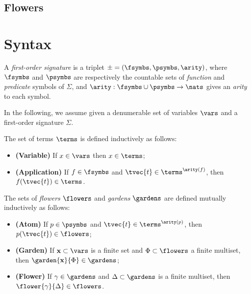 \subsection{Flowers}


\section*{Syntax}


\begin{definition}
  A \emph{first-order signature} is a triplet $\mathcal{\Sigma} = (
  \fsymbs, \psymbs, \arity )$, where $\fsymbs$ and $\psymbs$ are
  respectively the countable sets of \emph{function} and \emph{predicate}
  symbols of $\Sigma$, and $\arity : \fsymbs \cup \psymbs \to \nats$ gives an
  \emph{arity} to each symbol.
\end{definition}

In the following, we assume given a denumerable set of variables $\vars$
and a first-order signature $\Sigma$.

\begin{definition}[Terms]
  The set of terms $\terms$ is defined inductively as follows:
  \begin{itemize}
    \item{\textbf{(Variable)}} If $x \in \vars$ then $x \in \terms$;
    \item{\textbf{(Application)}} If $f \in \fsymbs$ and $\tvec{t}
    \in \terms^{\arity(f)}$, then $f(\tvec{t}) \in \terms$.
  \end{itemize}
\end{definition}

\begin{definition}[Flowers]
  The sets of \emph{flowers} $\flowers$ and \emph{gardens} $\gardens$ are
  defined mutually inductively as follows:
  \begin{itemize}
    \item{\textbf{(Atom)}} If $p \in \psymbs$ and $\tvec{t} \in
    \terms^{\arity(p)}$, then $p(\tvec{t}) \in \flowers$;
    \item{\textbf{(Garden)}} If $\mathbf{x} \subset \vars$ is a finite set and $\Phi
    \subset \flowers$ a finite multiset, then $\garden{\mathbf{x}}{\Phi} \in
    \gardens$;
    \item{\textbf{(Flower)}} If $\gamma \in \gardens$ and $\Delta \subset \gardens$
    is a finite multiset, then $\flower{\gamma}{\Delta} \in \flowers$.
  \end{itemize}
\end{definition}

